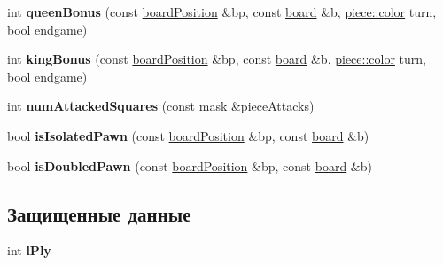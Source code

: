 \begin{DoxyCompactItemize}
\item 
\hypertarget{class_a_i_ada53e6fb423614dc425d33ae7f2f0dcf}{}int {\bfseries queen\+Bonus} (const \hyperlink{classboard_position}{board\+Position} \&bp, const \hyperlink{classboard}{board} \&b, \hyperlink{classpiece_a0e121e5952345fd0e7014a8e6a1fbbda}{piece\+::color} turn, bool endgame)\label{class_a_i_ada53e6fb423614dc425d33ae7f2f0dcf}

\item 
\hypertarget{class_a_i_aa6c91d60f9d36a1edafadfb84b67baf5}{}int {\bfseries king\+Bonus} (const \hyperlink{classboard_position}{board\+Position} \&bp, const \hyperlink{classboard}{board} \&b, \hyperlink{classpiece_a0e121e5952345fd0e7014a8e6a1fbbda}{piece\+::color} turn, bool endgame)\label{class_a_i_aa6c91d60f9d36a1edafadfb84b67baf5}

\item 
\hypertarget{class_a_i_ab019ac70f41b6fc7a477286d3d65b9da}{}int {\bfseries num\+Attacked\+Squares} (const mask \&piece\+Attacks)\label{class_a_i_ab019ac70f41b6fc7a477286d3d65b9da}

\item 
\hypertarget{class_a_i_a320ff94f5b15c0ed83ba704326ca23d3}{}bool {\bfseries is\+Isolated\+Pawn} (const \hyperlink{classboard_position}{board\+Position} \&bp, const \hyperlink{classboard}{board} \&b)\label{class_a_i_a320ff94f5b15c0ed83ba704326ca23d3}

\item 
\hypertarget{class_a_i_acd477b147adb58a9878b3c1499bf6ea1}{}bool {\bfseries is\+Doubled\+Pawn} (const \hyperlink{classboard_position}{board\+Position} \&bp, const \hyperlink{classboard}{board} \&b)\label{class_a_i_acd477b147adb58a9878b3c1499bf6ea1}

\end{DoxyCompactItemize}
\subsection*{Защищенные данные}
\begin{DoxyCompactItemize}
\item 
\hypertarget{class_a_i_a38e07f36c7574a06bf5e1001283fe404}{}int {\bfseries l\+Ply}\label{class_a_i_a38e07f36c7574a06bf5e1001283fe404}

\end{DoxyCompactItemize}
